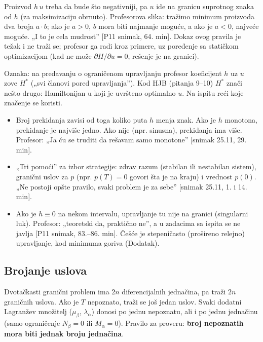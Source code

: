 \documentclass[11pt,a4paper,parskip=half,headsepline,numbers=noenddot]{scrartcl}
\DeclareRobustCommand{\izvor}[1]{{\small\color{izvorC}[#1]}}
\begin{document}
Proizvod \(h\,u\) treba da bude što negativniji, pa \(u\) ide na granicu suprotnog znaka od \(h\) (za maksimizaciju obrnuto). Profesorova slika: tražimo minimum proizvoda dva broja \(a\cdot b\); ako je \(a > 0\), \(b\) mora biti najmanje moguće, a ako je \(a < 0\), najveće moguće. „I to je cela mudrost'' \izvor{P11 snimak, 64. min}. Dokaz ovog pravila je težak i ne traži se; profesor ga radi kroz primere, uz poređenje sa statičkom optimizacijom (kad ne može \(\partial H/\partial u = 0\), rešenje je na granici).

Oznaka: na predavanju o ograničenom upravljanju profesor koeficijent \(h\) uz \(u\) zove \textbf{\(H^*\)} („svi članovi pored upravljanja''). Kod HJB (pitanja 9--10) \(H^*\) znači nešto drugo: Hamiltonijan u koji je uvršteno optimalno \(u\). Na ispitu reći koje značenje se koristi.

\begin{itemize}
\item Broj prekidanja zavisi od toga koliko puta \(h\) menja znak. Ako je \(h\) monotona, prekidanje je najviše jedno. Ako nije (npr. sinusna), prekidanja ima više. Profesor: „Ja ću se truditi da rešavam samo monotone'' \izvor{snimak 25.11, 29. min}.
\item „Tri pomoći'' za izbor strategije: zdrav razum (stabilan ili nestabilan sistem), granični uslov za \(p\) (npr. \(p(T) = 0\) govori šta je na kraju) i vrednost \(p(0)\). „Ne postoji opšte pravilo, svaki problem je za sebe'' \izvor{snimak 25.11, 1. i 14. min}.
\item Ako je \(h \equiv 0\) na nekom intervalu, upravljanje tu nije na granici (singularni luk). Profesor: „teoretski da, praktično ne'', a u zadacima sa ispita se ne javlja \izvor{P11 snimak, 83.--86. min}. Češće je stepeničasto (prošireno relejno) upravljanje, kod minimuma goriva (Dodatak).
\end{itemize}

\subsection{Brojanje uslova}

Dvotačkasti granični problem ima \(2n\) diferencijalnih jednačina, pa traži \(2n\) graničnih uslova. Ako je \(T\) nepoznato, traži se još jedan uslov. Svaki dodatni Lagranžev množitelj (\(\mu_\beta\), \(\lambda_\alpha\)) donosi po jednu nepoznatu, ali i po jednu jednačinu (samo ograničenje \(N_\beta = 0\) ili \(M_\alpha = 0\)). Pravilo za proveru: \textbf{broj nepoznatih mora biti jednak broju jednačina}.
\end{document}
